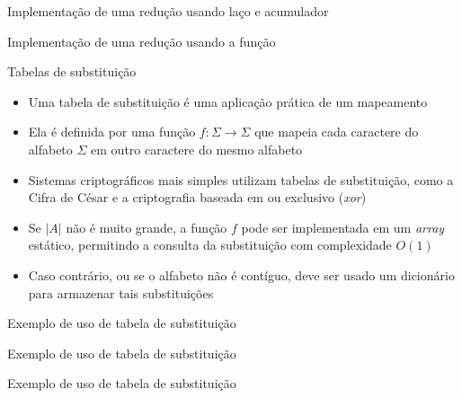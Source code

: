 \begin{frame}[fragile]{Implementação de uma redução usando laço e acumulador}
\end{frame}

\begin{frame}[fragile]{Implementação de uma redução usando a função }
\end{frame}

\begin{frame}[fragile]{Tabelas de substituição}

    \begin{itemize}
        \item Uma tabela de substituição é uma aplicação prática de um mapeamento
        \pause

        \item Ela é definida por uma função $f: \Sigma \to \Sigma$ que mapeia cada caractere do alfabeto 
            $\Sigma$ em outro caractere do mesmo alfabeto
        \pause

        \item Sistemas criptográficos mais simples utilizam tabelas de substituição, como a Cifra 
            de César e a criptografia baseada em ou exclusivo (\textit{xor})
        \pause

        \item Se $|A|$ não é muito grande, a função $f$ pode ser implementada em um \textit{array}
            estático, permitindo a consulta da substituição com complexidade $O(1)$
        \pause

        \item Caso contrário, ou se o alfabeto não é contíguo, deve ser usado um dicionário para 
            armazenar tais substituições
            
    \end{itemize}

\end{frame}

\begin{frame}[fragile]{Exemplo de uso de tabela de substituição}
\end{frame}

\begin{frame}[fragile]{Exemplo de uso de tabela de substituição}
\end{frame}

\begin{frame}[fragile]{Exemplo de uso de tabela de substituição}
\end{frame}
